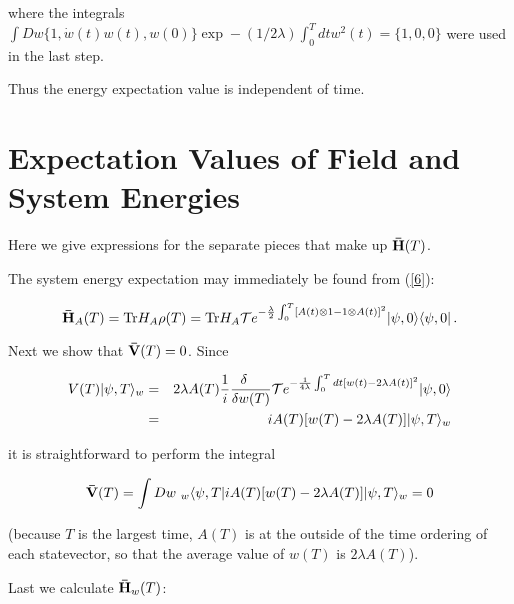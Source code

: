 \documentclass{article}
\begin{document}
\noindent where the integrals 
$\int Dw\{1,\dot{w}(t)w(t),w(0)\}\exp-(1/2\lambda)\int_{0}^{T}dtw^{2}(t)=\{1,0,0\}$ 
were used in the last step. 

	Thus the energy expectation value is independent of time.  

 \section{Expectation Values of Field and System Energies}\label{Expectation Values}
 
\hspace{\parindent}Here we give expressions for the separate pieces that 
make up ${\bf \bar{H}}(T)$.

	The system energy expectation may immediately be found from (\ref{6}):
	
\begin{equation}\label{13}
{\bf \bar{H}}_{A}(T)={\rm Tr} H_{A}\rho(T)
={\rm Tr}H_{A}{\cal T}e^
	{-\frac{\lambda}{2}\int_{0}^{T}[A(t)\otimes 1-1\otimes A(t)]^{2}}
	|\psi,0\rangle\langle \psi,0|\, .
\end{equation}

	Next we show that ${\bf \bar{V}}(T)=0$. Since 

\begin{eqnarray*}
V(T)|\psi,T\rangle_{w}& =& 2\lambda A(T)\frac{1}{i}\frac{\delta\quad}{\delta w(T)}
{\cal T} e^{-\frac{1}{4\lambda}\int_{0}^{T}dt[w(t)-2\lambda A(t)]^{2}}|\psi,0\rangle\\
& =&iA(T)[w(T)-2\lambda A(T)]|\psi,T\rangle_{w}	
\end{eqnarray*}

\noindent it is straightforward to perform the integral 

\begin{eqnarray*}
{\bf \bar{V}}(T)= \int Dw\ _{w}\langle \psi,T|iA(T)[w(T)-2\lambda A(T)]|\psi,T\rangle_{w}=0
\end{eqnarray*}

\noindent  (because  
$T$ is the largest time, $A(T)$ is at the outside of the time ordering of each statevector, 
so that the average value of $w(T)$ is $2\lambda A(T)$). 

	Last we calculate ${\bf \bar{H}}_{w}(T)$:
	
\end{document}
